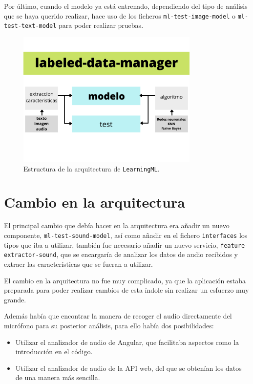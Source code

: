 \documentclass[a4paper, 12pt]{book}
\begin{document}
Por último, cuando el modelo ya está entrenado, dependiendo del tipo de análisis que se haya querido realizar, hace uso de los ficheros \texttt{ml-test-image-model} o \texttt{ml-test-text-model} para poder realizar pruebas.

\begin{figure}
	\centering
	\includegraphics[width=9cm, keepaspectratio]{img/arquitectura-learningml.png}
	\caption{Estructura de la arquitectura de \texttt{LearningML}.}\label{fig:arquitectura}
\end{figure}

\section{Cambio en la arquitectura}
\label{sec:cambio-arquitectura}

El principal cambio que debía hacer en la arquitectura era añadir un nuevo componente, \texttt{ml-test-sound-model}, así como añadir en el fichero \texttt{interfaces} los tipos que iba a utilizar, también fue necesario añadir un nuevo servicio, \texttt{feature-extractor-sound}, que se encargaría de analizar los datos de audio recibidos y extraer las características que se fueran a utilizar.

El cambio en la arquitectura no fue muy complicado, ya que la aplicación estaba preparada para poder realizar cambios de esta índole sin realizar un esfuerzo muy grande.

Además había que encontrar la manera de recoger el audio directamente del micrófono para su posterior análisis, para ello había dos posibilidades:
\begin{itemize}
	\item Utilizar el analizador de audio de Angular, que facilitaba aspectos como la introducción en el código.
	\item Utilizar el analizador de audio de la API web, del que se obtenían los datos de una manera más sencilla.
\end{itemize}
\end{document}
